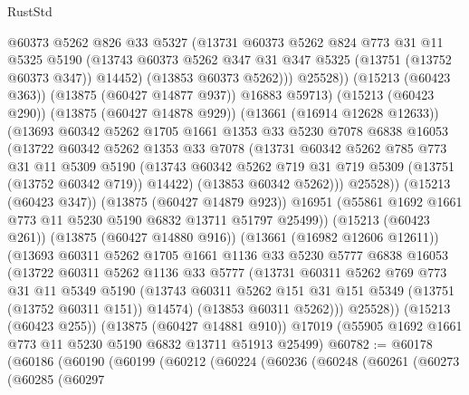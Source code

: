 \begin{lexlean}{RustStd}
\begin{coremodule}
                  @60373
                  @5262
                  @826
                  @33
                  @5327
                  (@13731
                    @60373
                    @5262
                    @824
                    @773
                    @31
                    @11
                    @5325
                    @5190
                    (@13743 @60373 @5262 @347 @31 @347 @5325 (@13751 (@13752 @60373 @347)) @14452)
                    (@13853 @60373 @5262)))
                @25528))
            (@15213 (@60423 @363))
            (@13875 (@60427 @14877 @937))
            @16883
            @59713)
          (@15213 (@60423 @290))
          (@13875 (@60427 @14878 @929))
          (@13661 (@16914 @12628 @12633))
          (@13693
            @60342
            @5262
            @1705
            @1661
            @1353
            @33
            @5230
            @7078
            @6838
            @16053
            (@13722
              @60342
              @5262
              @1353
              @33
              @7078
              (@13731
                @60342
                @5262
                @785
                @773
                @31
                @11
                @5309
                @5190
                (@13743 @60342 @5262 @719 @31 @719 @5309 (@13751 (@13752 @60342 @719)) @14422)
                (@13853 @60342 @5262)))
            @25528))
        (@15213 (@60423 @347))
        (@13875 (@60427 @14879 @923))
        @16951
        (@55861 @1692 @1661 @773 @11 @5230 @5190 @6832 @13711 @51797 @25499))
      (@15213 (@60423 @261))
      (@13875 (@60427 @14880 @916))
      (@13661 (@16982 @12606 @12611))
      (@13693
        @60311
        @5262
        @1705
        @1661
        @1136
        @33
        @5230
        @5777
        @6838
        @16053
        (@13722
          @60311
          @5262
          @1136
          @33
          @5777
          (@13731
            @60311
            @5262
            @769
            @773
            @31
            @11
            @5349
            @5190
            (@13743 @60311 @5262 @151 @31 @151 @5349 (@13751 (@13752 @60311 @151)) @14574)
            (@13853 @60311 @5262)))
        @25528))
    (@15213 (@60423 @255))
    (@13875 (@60427 @14881 @910))
    @17019
    (@55905 @1692 @1661 @773 @11 @5230 @5190 @6832 @13711 @51913 @25499)
@60782 := @60178
    (@60186
      (@60190
        (@60199
          (@60212
            (@60224
              (@60236
                (@60248
                  (@60261
                    (@60273
                      (@60285
                        (@60297

\end{coremodule}
\end{lexlean}
